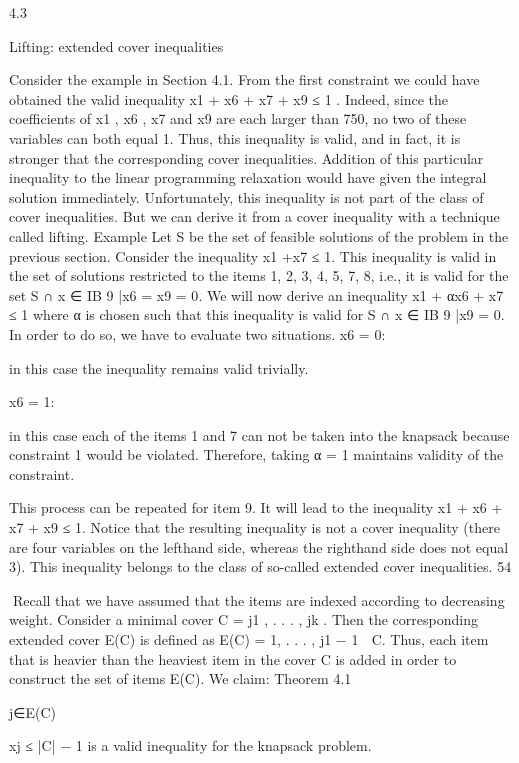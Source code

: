 \documentclass[titlepage]{book}
\theoremstyle{plain}
\theoremstyle{definition}
\theoremstyle{remark}
\begin{document}
4.3

Lifting: extended cover inequalities

Consider the example in Section 4.1. From the first constraint we could have obtained the valid inequality
x1 + x6 + x7 + x9 ≤ 1
. Indeed, since the coefficients of x1 , x6 , x7 and x9 are each larger than 750, no two of these variables
can both equal 1. Thus, this inequality is valid, and in fact, it is stronger that the corresponding cover
inequalities. Addition of this particular inequality to the linear programming relaxation would have
given the integral solution immediately. Unfortunately, this inequality is not part of the class of cover
inequalities. But we can derive it from a cover inequality with a technique called lifting.
Example Let S be the set of feasible solutions of the problem in the previous section. Consider the inequality x1 +x7 ≤ 1. This inequality is valid in the set of solutions restricted to the items {1, 2, 3, 4, 5, 7, 8},
i.e., it is valid for the set S ∩ {x ∈ IB 9 |x6 = x9 = 0}. We will now derive an inequality
x1 + αx6 + x7 ≤ 1
where α is chosen such that this inequality is valid for S ∩ {x ∈ IB 9 |x9 = 0}. In order to do so, we have
to evaluate two situations.
x6 = 0:

in this case the inequality remains valid trivially.

x6 = 1:

in this case each of the items 1 and 7 can not be taken into the knapsack because constraint 1
would be violated. Therefore, taking α = 1 maintains validity of the constraint.

This process can be repeated for item 9. It will lead to the inequality
x1 + x6 + x7 + x9 ≤ 1.
Notice that the resulting inequality is not a cover inequality (there are four variables on the lefthand side,
whereas the righthand side does not equal 3). This inequality belongs to the class of so-called extended
cover inequalities.
54

Recall that we have assumed that the items are indexed according to decreasing weight. Consider a
minimal cover C = {j1 , . . . , jk }. Then the corresponding extended cover E(C) is defined as
E(C) = {1, . . . , j1 − 1} ∪ C.
Thus, each item that is heavier than the heaviest item in the cover C is added in order to construct the
set of items E(C). We claim:
Theorem 4.1

j∈E(C)

xj ≤ |C| − 1 is a valid inequality for the knapsack problem.
\end{document}
